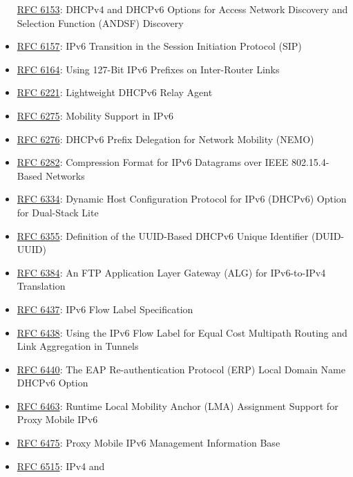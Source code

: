 \documentclass[
]{article}
\begin{document}
\begin{itemize}
  \href{https://www.rfc-editor.org/info/rfc6153}{RFC 6153}: DHCPv4 and
  DHCPv6 Options for Access Network Discovery and Selection Function
  (ANDSF) Discovery
\item
  \href{https://www.rfc-editor.org/info/rfc6157}{RFC 6157}: IPv6
  Transition in the Session Initiation Protocol (SIP)
\item
  \href{https://www.rfc-editor.org/info/rfc6164}{RFC 6164}: Using
  127-Bit IPv6 Prefixes on Inter-Router Links
\item
  \href{https://www.rfc-editor.org/info/rfc6221}{RFC 6221}: Lightweight
  DHCPv6 Relay Agent
\item
  \href{https://www.rfc-editor.org/info/rfc6275}{RFC 6275}: Mobility
  Support in IPv6
\item
  \href{https://www.rfc-editor.org/info/rfc6276}{RFC 6276}: DHCPv6
  Prefix Delegation for Network Mobility (NEMO)
\item
  \href{https://www.rfc-editor.org/info/rfc6282}{RFC 6282}: Compression
  Format for IPv6 Datagrams over IEEE 802.15.4-Based Networks
\item
  \href{https://www.rfc-editor.org/info/rfc6334}{RFC 6334}: Dynamic Host
  Configuration Protocol for IPv6 (DHCPv6) Option for Dual-Stack Lite
\item
  \href{https://www.rfc-editor.org/info/rfc6355}{RFC 6355}: Definition
  of the UUID-Based DHCPv6 Unique Identifier (DUID-UUID)
\item
  \href{https://www.rfc-editor.org/info/rfc6384}{RFC 6384}: An FTP
  Application Layer Gateway (ALG) for IPv6-to-IPv4 Translation
\item
  \href{https://www.rfc-editor.org/info/rfc6437}{RFC 6437}: IPv6 Flow
  Label Specification
\item
  \href{https://www.rfc-editor.org/info/rfc6438}{RFC 6438}: Using the
  IPv6 Flow Label for Equal Cost Multipath Routing and Link Aggregation
  in Tunnels
\item
  \href{https://www.rfc-editor.org/info/rfc6440}{RFC 6440}: The EAP
  Re-authentication Protocol (ERP) Local Domain Name DHCPv6 Option
\item
  \href{https://www.rfc-editor.org/info/rfc6463}{RFC 6463}: Runtime
  Local Mobility Anchor (LMA) Assignment Support for Proxy Mobile IPv6
\item
  \href{https://www.rfc-editor.org/info/rfc6475}{RFC 6475}: Proxy Mobile
  IPv6 Management Information Base
\item
  \href{https://www.rfc-editor.org/info/rfc6515}{RFC 6515}: IPv4 and

\end{itemize}
\end{document}
